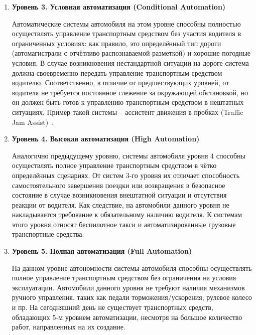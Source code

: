 \begin{enumerate}
	\item \textbf{Уровень 3. Условная автоматизация (Conditional Automation)}
	
	Автоматические системы автомобиля на этом уровне способны полностью осуществлять управление транспортным средством без участия водителя в ограниченных условиях: как правило, это определённый тип дороги (автомагистрали с отчётливо распознаваемой разметкой) и хорошие погодные условия. В случае возникновения нестандартной ситуации на дороге система должна своевременно передать управление транспортным средством водителю. Соответственно, в отличие от предшествующих уровней, от водителя не требуется постоянное слежение за окружающей обстановкой, но он должен быть готов к управлению транспортным средством в нештатных ситуациях. Пример такой системы -- ассистент движения в пробках (Traffic Jam Assist)~\cite{rao2019test}.
	
	\item \textbf{Уровень 4. Высокая автоматизация (High Automation)}
	
	Аналогично предыдущему уровню, системы автомобиля уровня 4 способны осуществлять полное управление транспортным средством в чётко определённых сценариях. От систем 3-го уровня их отличает способность самостоятельного завершения поездки или возвращения в безопасное состояние в случае возникновения внештатной ситуации и отсутствия реакции от водителя. Как следствие, на автомобили данного уровня не накладывается требование к обязательному наличию водителя. К системам этого уровня относят беспилотное такси и автоматизированные грузовые транспортные средства.
	
	\item \textbf{Уровень 5. Полная автоматизация (Full Automation)}
	
	На данном уровне автономности системы автомобиля способны осуществлять полное управление транспортным средством без ограничения на условия эксплуатации. Автомобили данного уровня не требуют наличия механизмов ручного управления, таких как педали торможения/ускорения, рулевое колесо и пр. На сегодняшний день не существует транспортных средств, обладающих 5-м уровнем автоматизации, несмотря на большое количество работ, направленных на их создание.
	
\end{enumerate}

